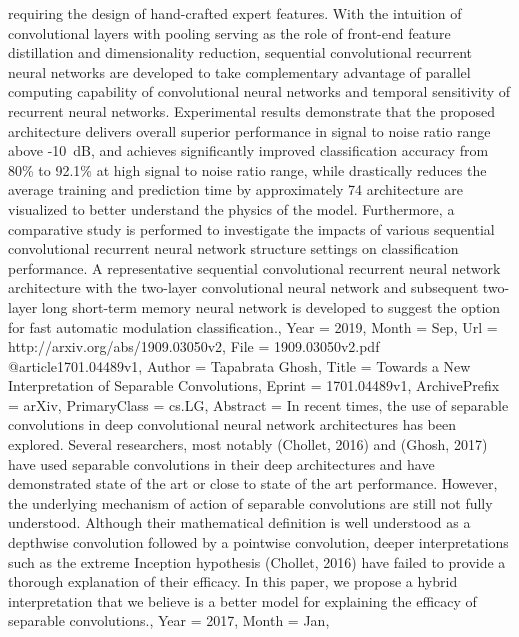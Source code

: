 {{{{{requiring the design of hand-crafted expert features. With the intuition of
convolutional layers with pooling serving as the role of front-end feature
distillation and dimensionality reduction, sequential convolutional recurrent
neural networks are developed to take complementary advantage of parallel
computing capability of convolutional neural networks and temporal sensitivity
of recurrent neural networks. Experimental results demonstrate that the
proposed architecture delivers overall superior performance in signal to noise
ratio range above -10~dB, and achieves significantly improved classification
accuracy from 80\% to 92.1\% at high signal to noise ratio range, while
drastically reduces the average training and prediction time by approximately
74%
architecture are visualized to better understand the physics of the model.
Furthermore, a comparative study is performed to investigate the impacts of
various sequential convolutional recurrent neural network structure settings on
classification performance. A representative sequential convolutional recurrent
neural network architecture with the two-layer convolutional neural network and
subsequent two-layer long short-term memory neural network is developed to
suggest the option for fast automatic modulation classification.},
Year          = {2019},
Month         = {Sep},
Url           = {http://arxiv.org/abs/1909.03050v2},
File          = {1909.03050v2.pdf}
}
@article{1701.04489v1,
Author        = {Tapabrata Ghosh},
Title         = {Towards a New Interpretation of Separable Convolutions},
Eprint        = {1701.04489v1},
ArchivePrefix = {arXiv},
PrimaryClass  = {cs.LG},
Abstract      = {In recent times, the use of separable convolutions in deep convolutional
neural network architectures has been explored. Several researchers, most
notably (Chollet, 2016) and (Ghosh, 2017) have used separable convolutions in
their deep architectures and have demonstrated state of the art or close to
state of the art performance. However, the underlying mechanism of action of
separable convolutions are still not fully understood. Although their
mathematical definition is well understood as a depthwise convolution followed
by a pointwise convolution, deeper interpretations such as the extreme
Inception hypothesis (Chollet, 2016) have failed to provide a thorough
explanation of their efficacy. In this paper, we propose a hybrid
interpretation that we believe is a better model for explaining the efficacy of
separable convolutions.},
Year          = {2017},
Month         = {Jan},
}}}}
